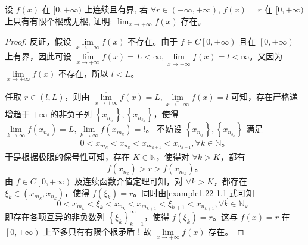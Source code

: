 \documentclass[../../main.tex]{subfiles}%
\begin{document}
\begin{example}
设 $f(x)$ 在 $[0, +\infty)$ 上连续且有界, 若 $\forall r \in (-\infty, +\infty)$, $f(x) = r$ 在 $[0, +\infty)$ 上只有有限个根或无根, 证明: $\lim_{x \to +\infty} f(x)$ 存在。
\end{example}
\begin{proof}
反证，假设 $\underset{x\rightarrow +\infty}{\lim}f\left( x \right)$ 不存在。由于 $f\in C\left[ 0,+\infty \right)$ 且在 $\left[ 0,+\infty \right)$ 上有界，因此可设 $\underset{x\rightarrow +\infty}{\overline{\lim }}f\left( x \right) =L<\infty ,\underset{x\rightarrow +\infty}{\underline{\lim }}f\left( x \right) =l<\infty$。又因为 $\underset{x\rightarrow +\infty}{\lim}f\left( x \right)$ 不存在，所以 $l<L$。

任取 $r\in \left( l,L \right)$，则由 $\underset{x\rightarrow +\infty}{\overline{\lim }}f\left( x \right) =L,\underset{x\rightarrow +\infty}{\underline{\lim }}f\left( x \right) =l$ 可知，存在严格递增趋于 $+\infty$ 的非负子列 $\left\{ x_{n_{l_k}} \right\},\left\{ x_{n_{s_k}} \right\}$，使得 $\underset{k\rightarrow \infty}{\lim}f\left( x_{n_k} \right) =L,\underset{k\rightarrow \infty}{\lim}f\left( x_{m_k} \right) =l$。
不妨设 $\left\{ x_{n_{l_k}} \right\},\left\{ x_{n_{s_k}} \right\}$ 满足  
\begin{align}
0<x_{m_k}<x_{n_k}<x_{m_{k+1}}<x_{n_{k+1}},\forall k\in \mathbb{N}。 \label{example1.22-1.1}
\end{align}
于是根据极限的保号性可知，存在 $K\in \mathbb{N}$，使得对 $\forall k>K$，都有  
\[
f\left( x_{n_k} \right) >r>f\left( x_{m_k} \right)。
\]
由 $f\in C\left[ 0,+\infty \right)$ 及连续函数介值定理可知，对 $\forall k>K$，都存在 $\xi _k\in \left( x_{m_k},x_{n_k} \right)$，使得 $f\left( \xi _k \right) =r$。同时由\eqref{example1.22-1.1}式可知  
\[
0<x_{m_k}<\xi _k<x_{n_k}<x_{m_{k+1}}<\xi _{k+1}<x_{n_{k+1}},\forall k\in \mathbb{N}。
\]
即存在各项互异的非负数列 $\left\{ \xi _k \right\} _{k=1}^{\infty}$，使得 $f\left( \xi _k \right) =r$。这与 $f\left( x \right) =r$ 在 $\left[ 0,+\infty \right)$ 上至多只有有限个根矛盾！故 $\underset{x\rightarrow +\infty}{\lim}f\left( x \right)$ 存在。
\end{proof}
\end{document}

